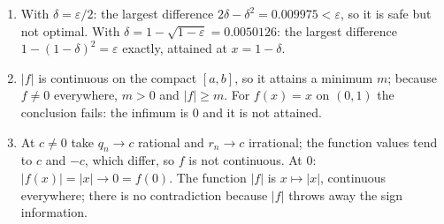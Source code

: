 \begin{enumerate}[label=\textbf{11.\arabic*}]
  \item With $\delta=\varepsilon/2$: the largest difference
        $2\delta-\delta^{2}=0.009975<\varepsilon$, so it is safe but not
        optimal. With $\delta=1-\sqrt{1-\varepsilon}=0.0050126$: the largest
        difference $1-(1-\delta)^{2}=\varepsilon$ exactly, attained at
        $x=1-\delta$.

  \item $\lvert f\rvert$ is continuous on the compact $[a,b]$, so it attains a minimum $m$;
        because $f\ne0$ everywhere, $m>0$ and $\lvert f\rvert\ge m$. For
        $f(x)=x$ on $(0,1)$ the conclusion fails: the infimum is $0$ and it is not
        attained.

  \item At $c\ne0$ take $q_{n}\to c$ rational and $r_{n}\to c$ irrational; the
        function values tend to $c$ and $-c$, which differ, so $f$ is not continuous. At $0$:
        $\lvert f(x)\rvert=\lvert x\rvert\to0=f(0)$. The function $\lvert f\rvert$
        is $x\mapsto\lvert x\rvert$, continuous everywhere; there is no
        contradiction because $\lvert f\rvert$ throws away the sign information.
\end{enumerate}

